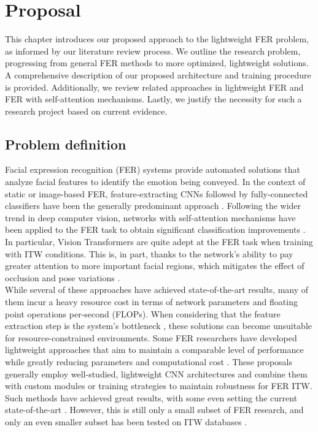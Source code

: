 \documentclass[../main.tex]{subfiles}
\begin{document}
\chapter{Proposal}

This chapter introduces our proposed approach to the lightweight FER problem, as informed by our literature review process. 
We outline the research problem, progressing from general FER methods to more optimized, lightweight solutions. 
A comprehensive description of our proposed architecture and training procedure is provided. 
Additionally, we review related approaches in lightweight FER and FER with self-attention mechanisms. 
Lastly, we justify the necessity for such a research project based on current evidence.
\newpage

\section{Problem definition}

Facial expression recognition (FER) systems provide automated solutions that analyze facial features to identify the emotion being conveyed. 
In the context of static or image-based FER, feature-extracting CNNs followed by fully-connected  classifiers have been the generally predominant approach \cite{canal2022survey}.
Following the wider trend in deep computer vision, networks with self-attention mechanisms have been applied to the FER task to obtain significant classification improvements \cite{lengwe2023pattlite, apvit2023, xue2021transfer, ma2023asf, huang2021, pecoraro2022lhc}.
In particular, Vision Transformers are quite adept at the FER task when training with ITW conditions.
This is, in part, thanks to the network's ability to pay greater attention to more important facial regions, which mitigates the effect of occlusion and pose variations \cite{karnati2023survey}.\\

While several of these approaches have achieved state-of-the-art results, many of them incur a heavy resource cost in terms of network parameters and floating point operations per-second (FLOPs).
When considering that the feature extraction step is the system's bottleneck \cite{karnati2023survey}, these solutions can become unsuitable for resource-constrained environments.
Some FER researchers have developed lightweight approaches that aim to maintain a comparable level of performance while greatly reducing parameters and computational cost \cite{eff-face2021, lengwe2023pattlite, hewitt2018, mitre2020, barros2020fc}.
These proposals generally employ well-studied, lightweight CNN architectures and combine them with custom modules or training strategies to maintain robustness for FER ITW.
Such methods have achieved great results, with some even setting the current state-of-the-art \cite{lengwe2023pattlite}.
However, this is still only a small subset of FER research, and only an even smaller subset has been tested on ITW databases \cite{eff-face2021}.\\
\end{document}
